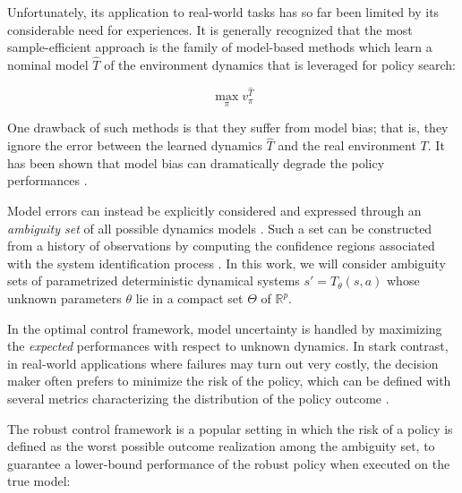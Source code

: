 \documentclass{article}
\begin{document}
Unfortunately, its application to real-world tasks has so far been limited by its considerable need for experiences. It is generally recognized \citep{Sutton1990,Atkeson1997} that the most sample-efficient approach is the family of model-based methods which learn a nominal model $\hat{T}$ of the environment dynamics that is leveraged for policy search:

\vspace{-5mm}
\begin{equation}
\label{nominal-control-eq}
\max_\pi v_\pi^{\hat{T}}
\end{equation}

\vspace{-3mm}
\noindent
One drawback of such methods is that they suffer from model bias; that is, they ignore the error between the learned dynamics $\hat{T}$ and the real environment $T$. It has been shown that model bias can dramatically degrade the policy performances \citep{Schneider1997}.

\vspace{-1mm}
Model errors can instead be explicitly considered and expressed through an \textit{ambiguity set} of all possible dynamics models%
. Such a set can be constructed from a history of observations by computing the confidence regions associated with the system identification process \citep{Iyengar2005, Nilim2005, Dean2017, Maillard2017}. In this work, we will consider ambiguity sets of parametrized deterministic dynamical systems $s' = T_\theta(s, a)$ whose unknown parameters $\theta$ lie in a compact set $\Theta$ of $\mathbb{R}^p$.


\vspace{-1mm}
In the optimal control framework, model uncertainty is handled by maximizing the \textit{expected} performances with respect to unknown dynamics. In stark contrast, in real-world applications where failures may turn out very costly, the decision maker often prefers to minimize the risk of the policy, which can be defined with several metrics characterizing the distribution of the policy outcome \citep{Garcia2015}.


\vspace{-1mm}
The robust control framework is a popular setting in which the risk of a policy is defined as the worst possible outcome realization among the ambiguity set, to guarantee a lower-bound performance of the robust policy when executed on the true model:  
\end{document}

